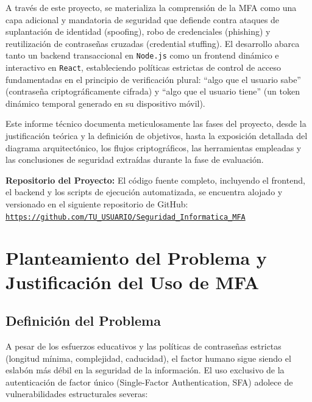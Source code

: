 \documentclass[12pt,a4paper]{article}
\begin{document}
A través de este proyecto, se materializa la comprensión de la MFA como una capa adicional y mandatoria de seguridad que defiende contra ataques de suplantación de identidad (spoofing), robo de credenciales (phishing) y reutilización de contraseñas cruzadas (credential stuffing). El desarrollo abarca tanto un backend transaccional en \texttt{Node.js} como un frontend dinámico e interactivo en \texttt{React}, estableciendo políticas estrictas de control de acceso fundamentadas en el principio de verificación plural: ``algo que el usuario sabe'' (contraseña criptográficamente cifrada) y ``algo que el usuario tiene'' (un token dinámico temporal generado en su dispositivo móvil).

Este informe técnico documenta meticulosamente las fases del proyecto, desde la justificación teórica y la definición de objetivos, hasta la exposición detallada del diagrama arquitectónico, los flujos criptográficos, las herramientas empleadas y las conclusiones de seguridad extraídas durante la fase de evaluación.

\vspace{0.5cm}
\noindent\textbf{Repositorio del Proyecto:} El código fuente completo, incluyendo el frontend, el backend y los scripts de ejecución automatizada, se encuentra alojado y versionado en el siguiente repositorio de GitHub: \\
\href{https://github.com/TU_USUARIO/Seguridad_Informatica_MFA}{\texttt{https://github.com/TU\_USUARIO/Seguridad\_Informatica\_MFA}}

\section{Planteamiento del Problema y Justificación del Uso de MFA}

\subsection{Definición del Problema}

A pesar de los esfuerzos educativos y las políticas de contraseñas estrictas (longitud mínima, complejidad, caducidad), el factor humano sigue siendo el eslabón más débil en la seguridad de la información. El uso exclusivo de la autenticación de factor único (Single-Factor Authentication, SFA) adolece de vulnerabilidades estructurales severas:
\end{document}

